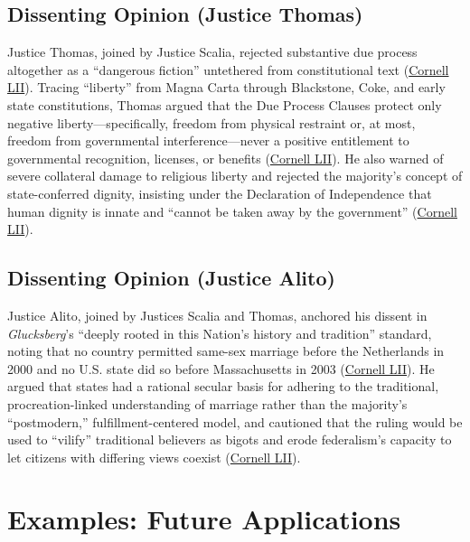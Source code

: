 \documentclass[12pt]{article}
\begin{document}
\subsection{Dissenting Opinion (Justice Thomas)}

Justice Thomas, joined by Justice Scalia, rejected substantive due process altogether as a ``dangerous fiction'' untethered from constitutional text (\href{https://www.law.cornell.edu/supremecourt/text/14-556}{Cornell LII}). Tracing ``liberty'' from Magna Carta through Blackstone, Coke, and early state constitutions, Thomas argued that the Due Process Clauses protect only negative liberty---specifically, freedom from physical restraint or, at most, freedom from governmental interference---never a positive entitlement to governmental recognition, licenses, or benefits (\href{https://www.law.cornell.edu/supremecourt/text/14-556}{Cornell LII}). He also warned of severe collateral damage to religious liberty and rejected the majority's concept of state-conferred dignity, insisting under the Declaration of Independence that human dignity is innate and ``cannot be taken away by the government'' (\href{https://www.law.cornell.edu/supremecourt/text/14-556}{Cornell LII}).

\subsection{Dissenting Opinion (Justice Alito)}

Justice Alito, joined by Justices Scalia and Thomas, anchored his dissent in \textit{Glucksberg}'s ``deeply rooted in this Nation's history and tradition'' standard, noting that no country permitted same-sex marriage before the Netherlands in 2000 and no U.S. state did so before Massachusetts in 2003 (\href{https://www.law.cornell.edu/supremecourt/text/14-556}{Cornell LII}). He argued that states had a rational secular basis for adhering to the traditional, procreation-linked understanding of marriage rather than the majority's ``postmodern,'' fulfillment-centered model, and cautioned that the ruling would be used to ``vilify'' traditional believers as bigots and erode federalism's capacity to let citizens with differing views coexist (\href{https://www.law.cornell.edu/supremecourt/text/14-556}{Cornell LII}).

\section{Examples: Future Applications}
\end{document}
